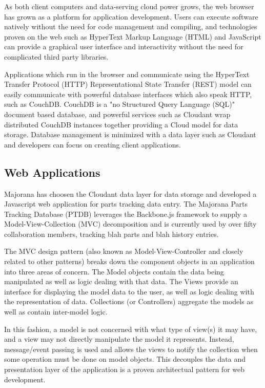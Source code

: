 \documentclass[journal]{IEEEtran}
\begin{document}
As both client computers and data-serving cloud power grows, the web browser has grown as a
platform for application development. Users can execute software natively without
the need for code management and compiling, and technologies proven on the web such as HyperText Markup Language (HTML)
and JavaScript can provide a graphical user interface and interactivity without the need
for complicated third party libraries. 

Applications which run in the browser and communicate using the HyperText Transfer Protocol (HTTP) Representational State Transfer
(REST) model can easily communicate with powerful database interfaces which also speak HTTP, such as
CouchDB. CouchDB is a "no Structured Query Language (SQL)" document based database, and powerful services such as Cloudant wrap
distributed CouchDB instances together providing a Cloud model for data storage. Database management
is minimized with a data layer such as Cloudant and developers can focus on creating client applications.

\subsection{Web Applications}
Majorana has choosen the Cloudant data layer for data storage and developed a Javascript web application
for parts tracking data entry. The Majorana Parts Tracking Database (PTDB) leverages the Backbone.js
framework to supply a Model-View-Collection (MVC) decomposition and is currently used by over fifty
collaboration members, tracking blah parts and blah history entries.

The MVC design pattern (also known as Model-View-Controller and closely related to other patterns) breaks
down the component objects in an application into three areas of concern. The Model objects contain 
the data being manipulated as well as logic dealing with that data. The Views provide an interface for
displaying the model data to the user, as well as logic dealing with the representation of data. 
Collections (or Controllers) aggregate the models as well as contain inter-model logic.

In this fashion, a model is not concerned with what type of view(s) it may have, and a view may 
not directly manipulate the model it represents. Instead, message/event passing is used and allows
the views to notify the collection when some operation must be done on model objects. This decouples
the data and presentation layer of the application is a proven architectual pattern for web development.
\end{document}

